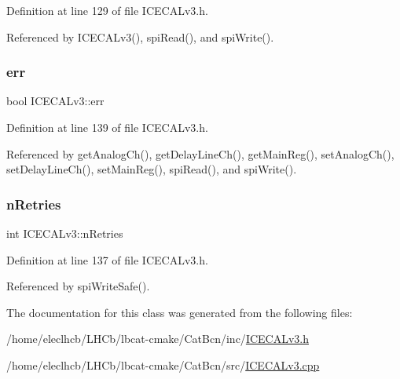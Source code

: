 Definition at line 129 of file I\+C\+E\+C\+A\+Lv3.\+h.



Referenced by I\+C\+E\+C\+A\+Lv3(), spi\+Read(), and spi\+Write().

\mbox{\label{classICECALv3_ad8989925ee5b3ff322d863ce6aaff0bd}} 
\subsubsection{\texorpdfstring{err}{err}}
{\footnotesize\ttfamily bool I\+C\+E\+C\+A\+Lv3\+::err\hspace{0.3cm}{\ttfamily [private]}}



Definition at line 139 of file I\+C\+E\+C\+A\+Lv3.\+h.



Referenced by get\+Analog\+Ch(), get\+Delay\+Line\+Ch(), get\+Main\+Reg(), set\+Analog\+Ch(), set\+Delay\+Line\+Ch(), set\+Main\+Reg(), spi\+Read(), and spi\+Write().

\mbox{\label{classICECALv3_ae877ce34b3a4d6c368cc6409ac9614fa}} 
\subsubsection{\texorpdfstring{n\+Retries}{nRetries}}
{\footnotesize\ttfamily int I\+C\+E\+C\+A\+Lv3\+::n\+Retries\hspace{0.3cm}{\ttfamily [private]}}



Definition at line 137 of file I\+C\+E\+C\+A\+Lv3.\+h.



Referenced by spi\+Write\+Safe().



The documentation for this class was generated from the following files\+:\begin{DoxyCompactItemize}
\item 
/home/eleclhcb/\+L\+H\+Cb/lbcat-\/cmake/\+Cat\+Bcn/inc/\hyperlink{ICECALv3_8h}{I\+C\+E\+C\+A\+Lv3.\+h}\item 
/home/eleclhcb/\+L\+H\+Cb/lbcat-\/cmake/\+Cat\+Bcn/src/\hyperlink{ICECALv3_8cpp}{I\+C\+E\+C\+A\+Lv3.\+cpp}\end{DoxyCompactItemize}
